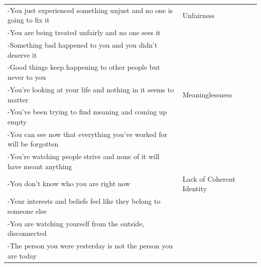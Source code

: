 \documentclass[11pt,oneside]{book}
\begin{document}
\begin{longtable}{>{\raggedright}p{} p{}}
-You just experienced something unjust and no one is going to fix it & Unfairness \\
-You are being treated unfairly and no one sees it &  \\
-Something bad happened to you and you didn't deserve it &  \\
-Good things keep happening to other people but never to you &  \\
\addlinespace

-You're looking at your life and nothing in it seems to matter & Meaninglessness \\
-You've been trying to find meaning and coming up empty &  \\
-You can see now that everything you've worked for will be forgotten &  \\
-You're watching people strive and none of it will have meant anything &  \\
\addlinespace

-You don't know who you are right now & Lack of Coherent Identity \\
-Your interests and beliefs feel like they belong to someone else &  \\
-You are watching yourself from the outside, disconnected &  \\
-The person you were yesterday is not the person you are today &  \\

\end{longtable}
\end{document}
